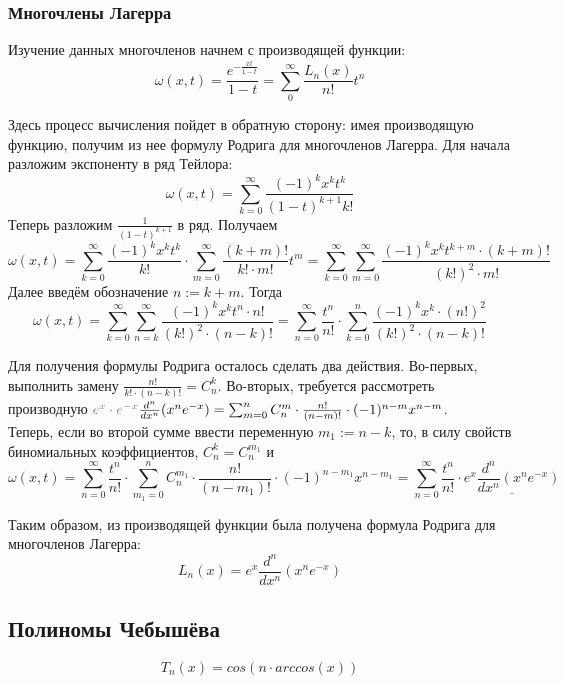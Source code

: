 	\subsubsection{Многочлены Лагерра}
	
	Изучение данных многочленов начнем с производящей функции:
	$$ \omega(x,t) = \frac{e^{-\frac{xt}{1-t}}}{1 - t} = \sum_0^{\infty} \frac{L_n(x)}{n!} t^n$$
	
	Здесь процесс вычисления пойдет в обратную сторону: имея производящую функцию, получим из нее формулу Родрига для
	многочленов Лагерра. Для начала разложим экспоненту в ряд Тейлора:
	$$ \omega(x,t) = \sum_{k=0}^{\infty} \frac{(-1)^k x^k t^k}{(1-t)^{k+1} k!}$$
	Теперь разложим $\frac{1}{(1-t)^{k+1}}$ в ряд. Получаем
	$$ \omega(x,t) = \sum_{k=0}^{\infty} \frac{(-1)^k x^k t^k}{k!} \cdot \sum_{m=0}^{\infty} \frac{(k+m)!}{k! \cdot m!} t^m
	 = \sum_{k=0}^{\infty} \sum_{m=0}^{\infty} \frac{(-1)^k x^k t^{k+m} \cdot (k+m)!}{(k!)^2 \cdot m!} $$
	Далее введём обозначение $n := k+m$. Тогда
	$$ \omega(x,t) = \sum_{k=0}^{\infty} \sum_{n=k}^{\infty} \frac{(-1)^k x^k t^n \cdot n!}{(k!)^2 \cdot (n-k)!}
	 = \sum_{n=0}^{\infty} \frac{t^n}{n!} \cdot \sum_{k=0}^{n} \frac{(-1)^k x^k \cdot (n!)^2}{(k!)^2 \cdot (n-k)!}$$
	 
	Для получения формулы Родрига осталось сделать два действия. Во-первых, выполнить замену $\frac{n!}{k! \cdot (n-k)!} = C_n^k$.
	Во-вторых, требуется рассмотреть производную ${\color{gray}e^x \cdot e^{-x}} \frac{d^n}{dx^n}(x^n e^{-x}) 
	= \sum_{m=0}^n C_n^m \cdot \frac{n!}{(n-m)!} \cdot (-1)^{n-m} x^{n-m}$. \\
	Теперь, если во второй сумме ввести переменную $m_1 := n - k$, то, в силу свойств биномиальных коэффициентов, $C_n^k = C_n^{m_1}$ и
	$$\omega(x,t) = \sum_{n=0}^{\infty} \frac{t^n}{n!} \cdot \sum_{m_1=0}^{n} C_n^{m_1} \cdot \frac{n!}{(n-m_1)!}
	\cdot (-1)^{n-m_1} x^{n-m_1} = \sum_{n=0}^{\infty} \frac{t^n}{n!} \cdot \underline{e^x \frac{d^n}{dx^n}(x^n e^{-x})}$$
	
	Таким образом, из производящей функции была получена формула Родрига для многочленов Лагерра:
	$$L_n(x) = e^x \frac{d^n}{dx^n}(x^n e^{-x})$$
	
	\subsection{Полиномы Чебышёва}
	$$T_n(x) = cos(n \cdot arccos(x))$$

